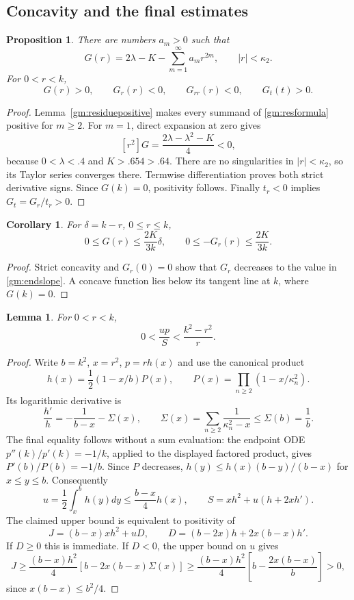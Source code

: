 \documentclass[11pt]{article}
\newtheorem{lemma}[theorem]{Lemma}
\newtheorem{proposition}[theorem]{Proposition}
\newtheorem{corollary}[theorem]{Corollary}
\theoremstyle{remark}
\begin{document}
\subsection{Concavity and the final estimates}
\begin{proposition}
There are numbers $a_m>0$ such that
\[
 G(r)=2\lambda-K-\sum_{m=1}^\infty a_m r^{2m},
 \qquad |r|<\kappa_2.
\]
For $0<r<k$,
\[
 G(r)>0,\qquad G_r(r)<0,\qquad G_{rr}(r)<0,
 \qquad G_t(t)>0.
\]
\end{proposition}
\begin{proof}
Lemma~\ref{gm:residuepositive} makes every summand of
\eqref{gm:resformula} positive for $m\ge2$. For $m=1$, direct expansion
at zero gives
\[
 [r^2]G=\frac{2\lambda-\lambda^2-K}{4}<0,
\]
because $0<\lambda<.4$ and $K>.654>.64$.
There are no singularities in $|r|<\kappa_2$, so its Taylor series
converges there. Termwise differentiation proves both strict
derivative signs. Since $G(k)=0$, positivity follows. Finally
$t_r<0$ implies $G_t=G_r/t_r>0$.
\end{proof}

\begin{corollary}
For $\delta=k-r$, $0\le r\le k$,
\[
 0\le G(r)\le\frac{2K}{3k}\delta,\qquad
 0\le-G_r(r)\le\frac{2K}{3k}.
\]
\end{corollary}
\begin{proof}
Strict concavity and $G_r(0)=0$ show that $G_r$ decreases to the
value in \eqref{gm:endslope}. A concave function lies below its tangent
line at $k$, where $G(k)=0$.
\end{proof}

\begin{lemma}\label{gm:tailratio}
For $0<r<k$,
\[
 0<\frac{up}{S}<\frac{k^2-r^2}{r}.
\]
\end{lemma}
\begin{proof}
Write $b=k^2$, $x=r^2$, $p=rh(x)$ and use the canonical product
\[
 h(x)=\frac12(1-x/b)P(x),\qquad
 P(x)=\prod_{n\ge2}(1-x/\kappa_n^2).
\]
Its logarithmic derivative is
\[
 \frac{h'}h=-\frac1{b-x}-\Sigma(x),\qquad
 \Sigma(x)=\sum_{n\ge2}\frac1{\kappa_n^2-x}\le\Sigma(b)=\frac1b.
\]
The final equality follows without a sum evaluation: the endpoint ODE
$p''(k)/p'(k)=-1/k$, applied to the displayed factored product,
gives $P'(b)/P(b)=-1/b$.
Since $P$ decreases, $h(y)\le h(x)(b-y)/(b-x)$ for $x\le y\le b$.
Consequently
\[
 u=\frac12\int_x^bh(y)dy\le\frac{b-x}{4}h(x),\qquad
 S=xh^2+u(h+2xh').
\]
The claimed upper bound is equivalent to positivity of
\[
 J=(b-x)xh^2+uD,\qquad D=(b-2x)h+2x(b-x)h'.
\]
If $D\ge0$ this is immediate. If $D<0$, the upper bound on $u$
gives
\[
 J\ge\frac{(b-x)h^2}{4}
       [b-2x(b-x)\Sigma(x)]
 \ge\frac{(b-x)h^2}{4}
       \left[b-\frac{2x(b-x)}b\right]>0,
\]
since $x(b-x)\le b^2/4$.
\end{proof}
\end{document}
